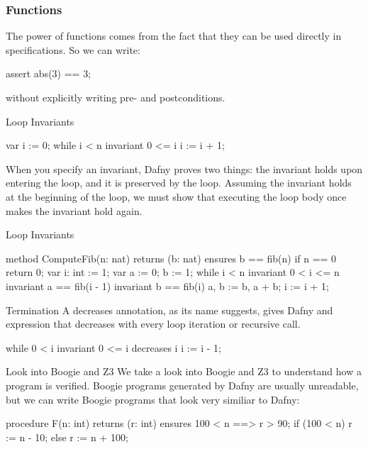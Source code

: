 \documentclass[10pt, compress]{beamer}
\begin{document}
\begin{frame}[fragile]
  \frametitle{Functions}
The power of functions comes from the fact that they can be used directly in specifications. So we can write:
  \begin{verbnobox}[\footnotesize]
assert abs(3) == 3;
  \end{verbnobox}
without explicitly writing pre- and postconditions.

\end{frame}

\begin{frame}[fragile]{Loop Invariants}

  \begin{verbnobox}[\footnotesize]
var i := 0;
while i < n
   invariant 0 <= i
{
   i := i + 1;
}
  \end{verbnobox}
When you specify an invariant, Dafny proves two things: the invariant holds upon entering the loop, and it is preserved by the loop.
Assuming the invariant holds at the beginning of the loop, we must show that executing the loop body once makes the invariant hold again.
\end{frame}

\begin{frame}[fragile]{Loop Invariants}
  \begin{verbnobox}[\footnotesize]
method ComputeFib(n: nat) returns (b: nat)
   ensures b == fib(n)
{
   if n == 0 { return 0; }
   var i: int := 1;
   var a := 0;
       b := 1;
   while i < n
      invariant 0 < i <= n
      invariant a == fib(i - 1)
      invariant b == fib(i)
   {
      a, b := b, a + b;
      i := i + 1;
   }
}
  \end{verbnobox}
\end{frame}

\begin{frame}[fragile]{Termination}
A decreases annotation, as its name suggests, gives Dafny and expression that decreases with every loop iteration or recursive call.
  \begin{verbnobox}[\footnotesize]
while 0 < i
   invariant 0 <= i
   decreases i
{
   i := i - 1;
}
  \end{verbnobox}
\end{frame}

\begin{frame}[fragile]{Look into Boogie and Z3}
  We take a look into Boogie and Z3 to understand how a program is verified.
  Boogie programs generated by Dafny are usually unreadable, but we can write Boogie programs that look very similiar to Dafny:
  \begin{verbnobox}[\footnotesize]
procedure F(n: int) returns (r: int)
  ensures 100 < n ==> r > 90;
{
  if (100 < n) {
    r := n - 10;
  } else {
    r := n + 100;
  }
}
  \end{verbnobox}
\end{frame}
\end{document}
